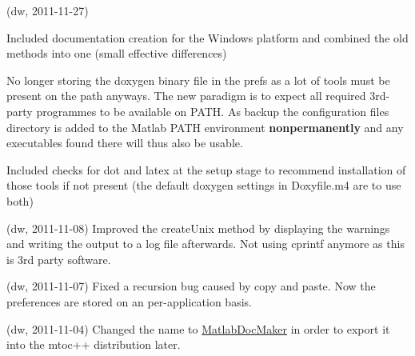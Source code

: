 
\begin{DoxyRefList}
\item[\label{changelog1_2__changelog1_2000001}%
\Hypertarget{changelog1_2__changelog1_2000001}%
Class \hyperlink{class_matlab_doc_maker}{Matlab\+Doc\+Maker} ](dw, 2011-\/11-\/27)
\begin{DoxyItemize}
\item Included documentation creation for the Windows platform and combined the old methods into one (small effective differences)
\item No longer storing the doxygen binary file in the prefs as a lot of tools must be present on the path anyways. The new paradigm is to expect all required 3rd-\/party programmes to be available on P\+A\+TH. As backup the configuration files directory is added to the Matlab P\+A\+TH environment {\bfseries nonpermanently} and any executables found there will thus also be usable.
\item Included checks for {\ttfamily dot} and {\ttfamily latex} at the setup stage to recommend installation of those tools if not present (the default doxygen settings in Doxyfile.\+m4 are to use both)
\end{DoxyItemize}

(dw, 2011-\/11-\/08) Improved the create\+Unix method by displaying the warnings and writing the output to a log file afterwards. Not using cprintf anymore as this is 3rd party software.

(dw, 2011-\/11-\/07) Fixed a recursion bug caused by copy and paste. Now the preferences are stored on an per-\/application basis.

(dw, 2011-\/11-\/04) Changed the name to \hyperlink{class_matlab_doc_maker}{Matlab\+Doc\+Maker} in order to export it into the mtoc++ distribution later.
\end{DoxyRefList}